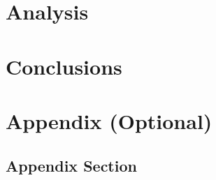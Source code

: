 \documentclass{bcrre_assignment}
\begin{document}
\chapter{Analysis}

\chapter{Conclusions}

\printbibliography

\appendix
\chapter{Appendix (Optional)}

\section{Appendix Section}
\end{document}
